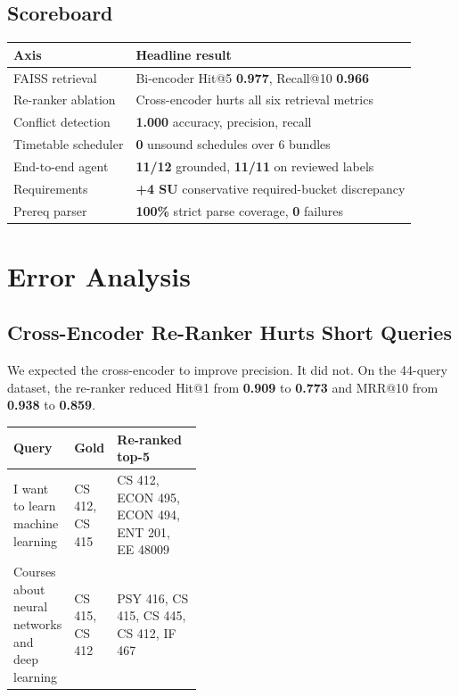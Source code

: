 \documentclass[10pt,letterpaper]{article}
\begin{document}
\subsection{Scoreboard}
\begin{table}[h]
\centering
\small
\begin{tabularx}{\linewidth}{@{}lY@{}}
\toprule
\textbf{Axis} & \textbf{Headline result} \\
\midrule
FAISS retrieval & Bi-encoder Hit@5 \textbf{0.977}, Recall@10 \textbf{0.966} \\
Re-ranker ablation & Cross-encoder hurts all six retrieval metrics \\
Conflict detection & \textbf{1.000} accuracy, precision, recall \\
Timetable scheduler & \textbf{0} unsound schedules over 6 bundles \\
End-to-end agent & \textbf{11/12} grounded, \textbf{11/11} on reviewed labels \\
Requirements & \textbf{+4 SU} conservative required-bucket discrepancy \\
Prereq parser & \textbf{100\%} strict parse coverage, \textbf{0} failures \\
\bottomrule
\end{tabularx}
\end{table}

\section{Error Analysis}

\subsection{Cross-Encoder Re-Ranker Hurts Short Queries}
We expected the cross-encoder to improve precision. It did not. On the 44-query dataset, the re-ranker reduced Hit@1 from \textbf{0.909} to \textbf{0.773} and MRR@10 from \textbf{0.938} to \textbf{0.859}.

\begin{table}[h]
\centering
\scriptsize
\begin{tabularx}{\linewidth}{@{}p{0.24\linewidth}p{0.18\linewidth}Y@{}}
\toprule
\textbf{Query} & \textbf{Gold} & \textbf{Re-ranked top-5} \\
\midrule
I want to learn machine learning & CS 412, CS 415 & CS 412, ECON 495, ECON 494, ENT 201, EE 48009 \\
Courses about neural networks and deep learning & CS 415, CS 412 & PSY 416, CS 415, CS 445, CS 412, IF 467 \\
\bottomrule
\end{tabularx}
\end{table}
\end{document}
